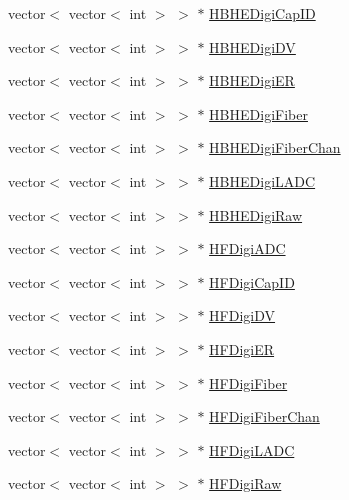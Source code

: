 \begin{DoxyCompactItemize}
\item 
vector$<$ vector$<$ int $>$ $>$ $\ast$ \hyperlink{class_hcal_tuple_tree_a300d8be67219f5369ac7ce004f95b554}{H\+B\+H\+E\+Digi\+Cap\+I\+D}
\item 
vector$<$ vector$<$ int $>$ $>$ $\ast$ \hyperlink{class_hcal_tuple_tree_a170d23abeaeed048957ada3b4a15f570}{H\+B\+H\+E\+Digi\+D\+V}
\item 
vector$<$ vector$<$ int $>$ $>$ $\ast$ \hyperlink{class_hcal_tuple_tree_a1d61f55b869a51c062b92a71be950b6f}{H\+B\+H\+E\+Digi\+E\+R}
\item 
vector$<$ vector$<$ int $>$ $>$ $\ast$ \hyperlink{class_hcal_tuple_tree_ae14f61c3fa4bc10c7ca6bd3da8d35efb}{H\+B\+H\+E\+Digi\+Fiber}
\item 
vector$<$ vector$<$ int $>$ $>$ $\ast$ \hyperlink{class_hcal_tuple_tree_a227e7a0df2915b2349bbfb0b5dc7d9c2}{H\+B\+H\+E\+Digi\+Fiber\+Chan}
\item 
vector$<$ vector$<$ int $>$ $>$ $\ast$ \hyperlink{class_hcal_tuple_tree_a011228f536f5778b8f97fce17ddbd714}{H\+B\+H\+E\+Digi\+L\+A\+D\+C}
\item 
vector$<$ vector$<$ int $>$ $>$ $\ast$ \hyperlink{class_hcal_tuple_tree_a7bffd95bc16723e633cfe233e57f21b6}{H\+B\+H\+E\+Digi\+Raw}
\item 
vector$<$ vector$<$ int $>$ $>$ $\ast$ \hyperlink{class_hcal_tuple_tree_a6b10444e0b3e05ebcd322870130dd20e}{H\+F\+Digi\+A\+D\+C}
\item 
vector$<$ vector$<$ int $>$ $>$ $\ast$ \hyperlink{class_hcal_tuple_tree_a6257529e73c5059596f204b05bc8d894}{H\+F\+Digi\+Cap\+I\+D}
\item 
vector$<$ vector$<$ int $>$ $>$ $\ast$ \hyperlink{class_hcal_tuple_tree_adc64a7cf0e29af0c19a864d1ee5541c7}{H\+F\+Digi\+D\+V}
\item 
vector$<$ vector$<$ int $>$ $>$ $\ast$ \hyperlink{class_hcal_tuple_tree_a9a2b7882484368d1d4976f6388d306c7}{H\+F\+Digi\+E\+R}
\item 
vector$<$ vector$<$ int $>$ $>$ $\ast$ \hyperlink{class_hcal_tuple_tree_afa91f65c9740c7625235ef9da5adefc3}{H\+F\+Digi\+Fiber}
\item 
vector$<$ vector$<$ int $>$ $>$ $\ast$ \hyperlink{class_hcal_tuple_tree_a739afd6b2bb92d5fd58d345333531cc9}{H\+F\+Digi\+Fiber\+Chan}
\item 
vector$<$ vector$<$ int $>$ $>$ $\ast$ \hyperlink{class_hcal_tuple_tree_aba96a4641a9750ed5bcc626abbe44c3c}{H\+F\+Digi\+L\+A\+D\+C}
\item 
vector$<$ vector$<$ int $>$ $>$ $\ast$ \hyperlink{class_hcal_tuple_tree_ae3043c51037d009294ec7567b8c9ce01}{H\+F\+Digi\+Raw}

\end{DoxyCompactItemize}
